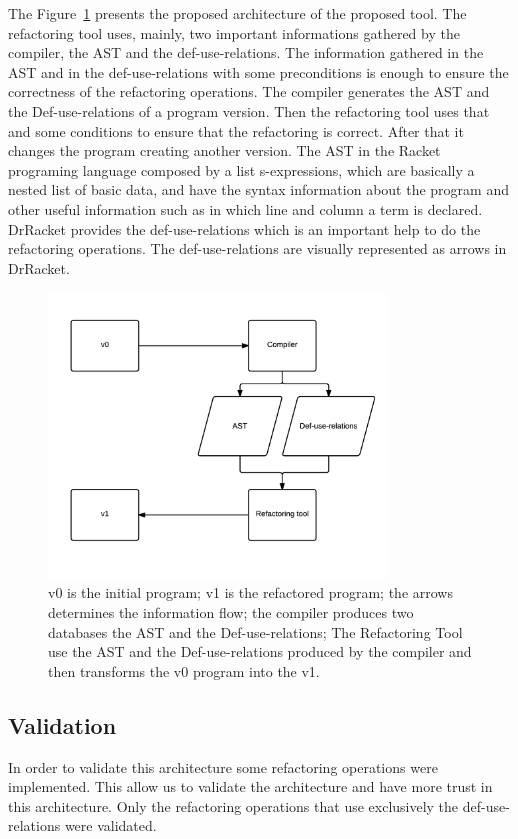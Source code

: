 The Figure~\ref{fig:architecture} presents the proposed architecture of the proposed tool. 
The refactoring tool uses, mainly, two important informations gathered by the compiler, the AST and the def-use-relations.
The information gathered in the AST and in the def-use-relations with some preconditions is enough to ensure the correctness of the refactoring operations.
The compiler generates the AST and the Def-use-relations of a program version. Then the refactoring tool uses that and some conditions to ensure that the refactoring is correct. After that it changes the program creating another version.
The AST in the Racket programing language composed by a list s-expressions, which are basically a nested list of basic data, and have the syntax information about the program and other useful information such as in which line and column a term is declared.
DrRacket provides the def-use-relations which is an important help to do the refactoring operations. The def-use-relations are visually represented as arrows in DrRacket.

\begin{figure}[htbp]
	\centering
	\includegraphics[width=0.8\textwidth]{img/arquitectura.png}
	\caption{v0 is the initial program; v1 is the refactored program; the arrows determines the information flow; the compiler produces two databases the AST and the Def-use-relations; The Refactoring Tool use the AST and the Def-use-relations produced by the compiler and then transforms the v0 program into the v1.}
	\label{fig:architecture}
\end{figure}


\subsection{Validation}
In order to validate this architecture some refactoring operations were implemented. 
This allow us to validate the architecture and have more trust in this architecture.
Only the refactoring operations that use exclusively the def-use-relations were validated.

